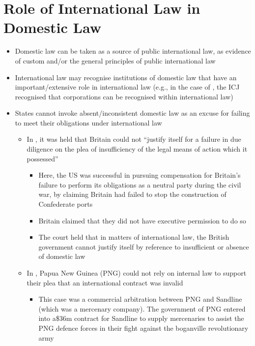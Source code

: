 \section{Role of International Law in Domestic Law}
\begin{itemize}
    \item Domestic law can be taken as a source of public international law, as evidence of custom and/or the general principles of public international law
    \item International law may recognise institutions of domestic law that have an important/extensive role in international law (e.g., in the case of , the ICJ recognised that corporations can be recognised within international law)
    \item States cannot invoke absent/inconsistent domestic law as an excuse for failing to meet their obligations under international law
    \begin{itemize}
        \item In , it was held that Britain could not ``justify itself for a failure in due diligence on the plea of insufficiency of the legal means of action which it possessed''
        \begin{itemize}
            \item Here, the US was successful in pursuing compensation for Britain's failure to perform its obligations as a neutral party during the civil war, by claiming Britain had failed to stop the construction of Confederate ports
            \item Britain claimed that they did not have executive permission to do so
            \item The court held that in matters of international law, the British government cannot justify itself by reference to insufficient or absence of domestic law
        \end{itemize}
        \item In , Papua New Guinea (PNG) could not rely on internal law to support their plea that an international contract was invalid
        \begin{itemize}
            \item This case was a commercial arbitration between PNG and Sandline (which was a mercenary company). The government of PNG entered into a\$36m contract for Sandline to supply mercenaries to assist the PNG defence forces in their fight against the boganville revolutionary army

\end{itemize}
\end{itemize}
\end{itemize}
